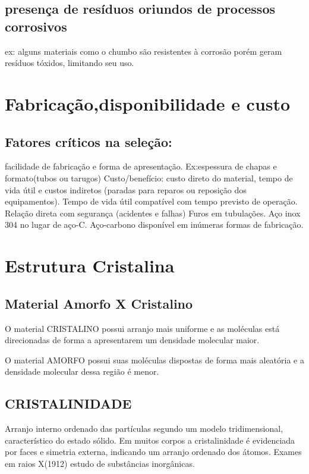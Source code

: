 \subsection*{presença de resíduos oriundos de processos corrosivos}
ex: alguns materiais como o chumbo são resistentes à corrosão porém geram resíduos tóxidos, limitando seu uso.

\section{Fabricação,disponibilidade e custo}


\subsection*{Fatores críticos na seleção:} facilidade de fabricação e forma de apresentação. Ex:espessura de chapas e formato(tubos ou tarugos)
Custo/benefício: custo direto do material, tempo de vida útil e custos indiretos (paradas para reparos ou reposição dos equipamentos).
Tempo de vida útil compatível com tempo previsto de operação.
Relação direta com segurança (acidentes e falhas)
Furos em tubulações.
Aço inox 304 no lugar de aço-C.
Aço-carbono disponível em inúmeras formas de fabricação.


\section{Estrutura Cristalina}

\subsection*{Material Amorfo X Cristalino}
O material CRISTALINO possui arranjo mais uniforme e as moléculas está direcionadas de forma a apresentarem um densidade molecular maior. 

O material AMORFO possui suas moléculas dispostas de forma mais aleatória e a densidade molecular dessa região é menor.


\subsection*{CRISTALINIDADE} Arranjo interno ordenado das partículas segundo um modelo tridimensional, característico do estado sólido. Em muitos corpos a cristalinidade é evidenciada por faces e simetria externa, indicando um arranjo ordenado dos átomos. Exames em raios X(1912) estudo de substâncias inorgânicas.

